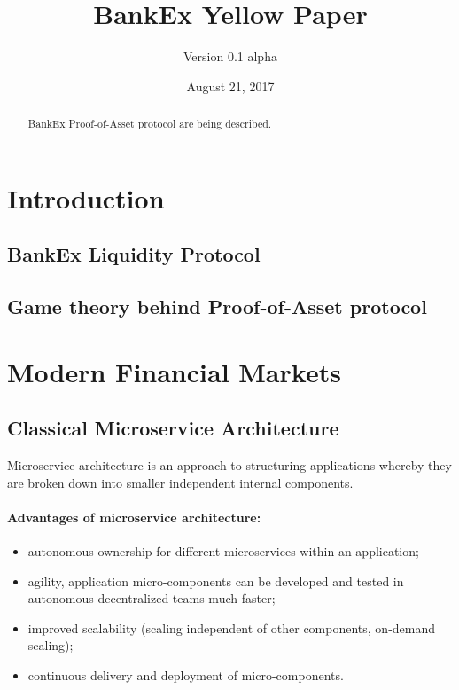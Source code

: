\documentclass{article}
\title{BankEx Yellow Paper}
\author{Version 0.1 alpha}
\date{August 21, 2017}
\begin{document}
\maketitle

\begin{abstract}
BankEx Proof-of-Asset protocol are being described.
\end{abstract}

\vspace{24pt}

\begin{multicols}{2}

\section{Introduction}

\subsection{BankEx Liquidity Protocol}

\subsection{Game theory behind Proof-of-Asset protocol}

\section{Modern Financial Markets}

\subsection{Classical Microservice Architecture}

Microservice architecture is an approach to structuring applications whereby they are broken down into smaller independent internal components.

\paragraph{Advantages of microservice architecture:}

\begin{itemize}
\item autonomous ownership for different microservices within an application;
\item agility, application micro-components can be developed and tested in autonomous decentralized teams much faster;
\item improved scalability (scaling independent of other components, on-demand scaling);
\item continuous delivery and deployment of micro-components.
\end{itemize}


\end{multicols}
\end{document}
